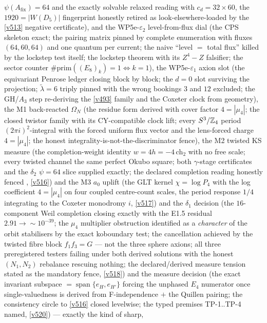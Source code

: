 $\psi(A_{\mathrm{fix}})=64$ and the exactly solvable relaxed reading with
$c_d=32\times60$, the $1920=|W(D_5)|$ fingerprint honestly retired as look-elsewhere-loaded by
the \vref{v513} negative certificate), and the
WP5e-$\varepsilon_2$ level-from-flux dial (the CPS skeleton exact; the pairing matrix pinned by
complete enumeration with fluxes $(64,60,64)$ and one quantum per current; the naive ``level $=$
total flux'' killed by the lockstep test itself; the lockstep theorem with its $Z^4{-}Z$
falsifier; the sector counter $\#\mathrm{prim}((E_8)_k)=1\Leftrightarrow k=1$), the
WP5e-$\varepsilon_1$ axion slot (the equivariant Penrose ledger closing block by block; the
$d=0$ slot surviving the projection; $\tilde\lambda=6$ triply pinned with the wrong bookings $3$
and $12$ excluded; the GH/$A_3$ step re-deriving the \vref{v493} family and the Coxeter clock
from geometry), the M1 back-reacted $\Omega_N$ (the residue form derived with cover factor
$4=|\mu_4|$; the closed twistor family with its CY-compatible clock lift; every $S^3/\mathbb Z_4$
period $(2\pi i)^2$-integral with the forced uniform flux vector and the lens-forced charge
$4=|\mu_4|$; the honest integrality-is-not-the-discriminator fence), the M2 twisted KS measure
(the completion-weight identity $w=4h=-4\,\mathrm{ch}_2$ with no free scale; every twisted
channel the same perfect Okubo square; both $\gamma$-stage certificates and the $\delta_2$
$\psi=64$ slice supplied exactly; the declared completion reading honestly fenced \mC,
\vref{v516}) and the M3 $a_0$ uplift (the GLT kernel $\chi=\log P_4$ with the log coefficient
$4=|\mu_4|$ on four coupled centre-count scales, the period response $1/4$ integrating to the
Coxeter monodromy $i$, \vref{v517}) and the $\delta_1$ decision (the $16$-component Weil
completion closing exactly with the E1.5 residual $2.91\to\sim10^{-39}$; the $\mu_4$
multiplier obstruction identified as a \emph{character} of the orbit stabilisers by the exact
koboundary test; the cancellation achieved by the twisted fibre block $f_1f_3=G$ --- not the
three sphere axions; all three preregistered testers failing under both derived solutions with
the honest $(N_1,N_2)$ rebalance rescuing nothing; the declared/derived measure tension stated
as the mandatory fence, \vref{v518}) and the measure decision (the exact invariant subspace
$=\operatorname{span}\{e_H,e_{H'}\}$ forcing the unphased $E_4$ numerator once
single-valuedness is derived from F-independence $+$ the Quillen pairing; the consistency
circle to \vref{v516} closed levelwise; the typed premises TP-1..TP-4 named,
\vref{v520}) --- exactly the kind of sharp,
